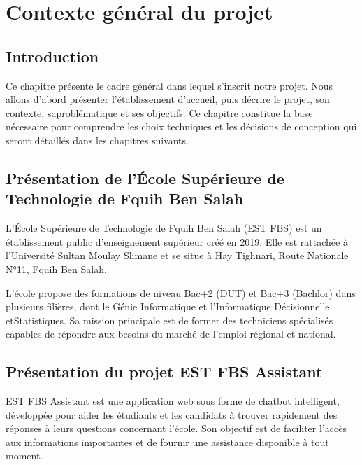 \documentclass[12pt, a4paper, twoside]{report}
\begin{document}
\chapter{Contexte général du projet}

\section{Introduction}
Ce chapitre présente le cadre général dans lequel s'inscrit notre projet. Nous allons d'abord présenter l'établissement d'accueil, puis décrire le projet, son contexte, sa\newline problématique et ses objectifs. Ce chapitre constitue la base nécessaire pour comprendre les choix techniques et les décisions de conception qui seront détaillés dans les chapitres suivants.


\section{Présentation de l'École Supérieure de Technologie de Fquih Ben Salah}
L'École Supérieure de Technologie de Fquih Ben Salah (EST FBS) est un \newline établissement public d'enseignement supérieur créé en 2019. Elle est rattachée à \newline l'Université Sultan Moulay Slimane et se situe à Hay Tighnari, Route \newline Nationale N°11, Fquih Ben Salah. \newline

L'école propose des formations de niveau Bac+2 (DUT) et Bac+3 (Bachlor) dans \newline plusieurs filières, dont le Génie Informatique et l'Informatique Décisionnelle et\newline Statistiques. Sa mission principale est de former des techniciens spécialisés \newline capables de répondre aux besoins du marché de l'emploi régional et national.
 \newpage
\section{Présentation du projet EST FBS Assistant}

EST FBS Assistant est une application web sous forme de chatbot intelligent, \newline développée pour aider les étudiants et les candidats à trouver rapidement des réponses à leurs questions concernant l’école. Son objectif est de faciliter l’accès aux informations importantes et de fournir une assistance disponible à tout moment. \newline
\end{document}
